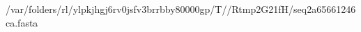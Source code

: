 \documentclass[10pt]{article}
\begin{document}
\begin{texshade}{/var/folders/rl/ylpkjhgj6rv0jsfv3brrbby80000gp/T//Rtmp2G21fH/seq2a65661246ca.fasta}
\hidelogoscale
{}
\showlegend
\end{texshade}
\end{document}
